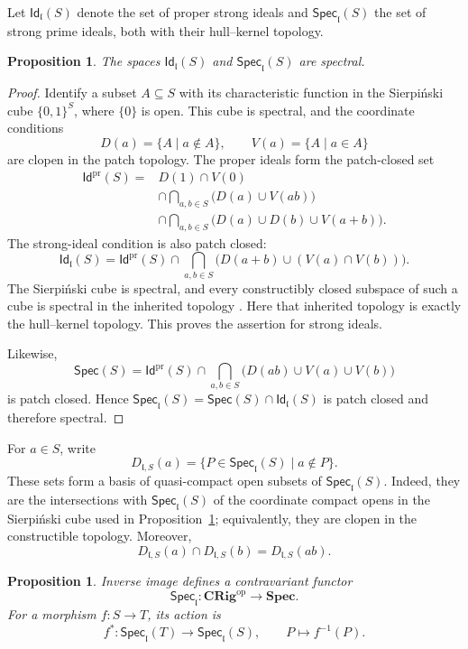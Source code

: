 \documentclass[12pt,leqno]{amsart}
\newcommand{\CRig}{\mathbf{CRig}}
\newcommand{\SpecSp}{\mathbf{Spec}}
\newcommand{\Spec}{\mathsf{Spec}}
\newcommand{\Specl}{\mathsf{Spec}_{\mathfrak l}}
\newcommand{\Id}{\mathsf{Id}}
\newcommand{\op}{\mathrm{op}}
\newtheorem{proposition}[theorem]{Proposition}
\theoremstyle{definition}
\numberwithin{equation}{section}
\theoremstyle{remark}
\begin{document}
Let \(\Id_{\mathfrak l}(S)\) denote the set of proper strong ideals and \(\Specl(S)\) the set of strong prime ideals, both with their hull--kernel topology.

\begin{proposition}\label{prop:strong-ideal-spectra}
The spaces \(\Id_{\mathfrak l}(S)\) and \(\Specl(S)\) are spectral.
\end{proposition}

\begin{proof}
Identify a subset \(A\subseteq S\) with its characteristic function in the Sierpiński cube \(\{0,1\}^S\), where \(\{0\}\) is open. This cube is spectral, and the coordinate conditions
\[
D(a)=\{A\mid a\notin A\},
\qquad
V(a)=\{A\mid a\in A\}
\]
are clopen in the patch topology. The proper ideals form the patch-closed set
\begin{align*}
\Id^{\mathrm{pr}}(S)
={}&D(1)\cap V(0)\\
&\cap\bigcap_{a,b\in S}\bigl(D(a)\cup V(ab)\bigr)\\
&\cap\bigcap_{a,b\in S}\bigl(D(a)\cup D(b)\cup V(a+b)\bigr).
\end{align*}
The strong-ideal condition is also patch closed:
\[
\Id_{\mathfrak l}(S)
 =\Id^{\mathrm{pr}}(S)\cap
  \bigcap_{a,b\in S}
  \bigl(D(a+b)\cup(V(a)\cap V(b))\bigr).
\]
The Sierpi\'nski cube is spectral, and every constructibly closed subspace of such a cube is spectral in the inherited topology \cite[Lemma~5.23.13]{StacksSpectral}. Here that inherited topology is exactly the hull--kernel topology. This proves the assertion for strong ideals.

Likewise,
\[
\Spec(S)
 =\Id^{\mathrm{pr}}(S)\cap
  \bigcap_{a,b\in S}
  \bigl(D(ab)\cup V(a)\cup V(b)\bigr)
\]
is patch closed. Hence
\(\Specl(S)=\Spec(S)\cap\Id_{\mathfrak l}(S)\) is patch closed and therefore spectral.
\end{proof}

For \(a\in S\), write
\[
D_{\mathfrak l,S}(a)=\{P\in\Specl(S)\mid a\notin P\}.
\]
These sets form a basis of quasi-compact open subsets of \(\Specl(S)\). Indeed, they are the intersections with \(\Specl(S)\) of the coordinate compact opens in the Sierpi\'nski cube used in Proposition~\ref{prop:strong-ideal-spectra}; equivalently, they are clopen in the constructible topology. Moreover,
\[
D_{\mathfrak l,S}(a)\cap D_{\mathfrak l,S}(b)
 =D_{\mathfrak l,S}(ab).
\]

\begin{proposition}\label{prop:strong-spectrum-functor}
Inverse image defines a contravariant functor
\[
\Specl\colon\CRig^{\op}\longrightarrow\SpecSp.
\]
For a morphism \(f\colon S\to T\), its action is
\[
f^*\colon\Specl(T)\longrightarrow\Specl(S),
\qquad P\longmapsto f^{-1}(P).
\]
\end{proposition}
\end{document}
